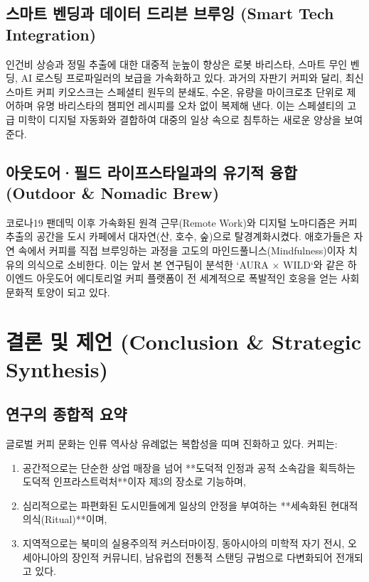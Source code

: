 \documentclass[10pt,a4paper]{article}
\begin{document}
\subsection{스마트 벤딩과 데이터 드리븐 브루잉 (Smart Tech Integration)}
인건비 상승과 정밀 추출에 대한 대중적 눈높이 향상은 로봇 바리스타, 스마트 무인 벤딩, AI 로스팅 프로파일러의 보급을 가속화하고 있다.
과거의 자판기 커피와 달리, 최신 스마트 커피 키오스크는 스페셜티 원두의 분쇄도, 수온, 유량을 마이크로초 단위로 제어하며 유명 바리스타의 챔피언 레시피를 오차 없이 복제해 낸다. 이는 스페셜티의 고급 미학이 디지털 자동화와 결합하여 대중의 일상 속으로 침투하는 새로운 양상을 보여준다.

\subsection{아웃도어·필드 라이프스타일과의 유기적 융합 (Outdoor \& Nomadic Brew)}
코로나19 팬데믹 이후 가속화된 원격 근무(Remote Work)와 디지털 노마디즘은 커피 추출의 공간을 도시 카페에서 대자연(산, 호수, 숲)으로 탈경계화시켰다.
애호가들은 자연 속에서 커피를 직접 브루잉하는 과정을 고도의 마인드풀니스(Mindfulness)이자 치유의 의식으로 소비한다. 이는 앞서 본 연구팀이 분석한 `AURA × WILD`와 같은 하이엔드 아웃도어 에디토리얼 커피 플랫폼이 전 세계적으로 폭발적인 호응을 얻는 사회문화적 토양이 되고 있다.

\section{결론 및 제언 (Conclusion \& Strategic Synthesis)}

\subsection{연구의 종합적 요약}
글로벌 커피 문화는 인류 역사상 유례없는 복합성을 띠며 진화하고 있다. 커피는:
\begin{enumerate}[itemsep=2pt]
    \item 공간적으로는 단순한 상업 매장을 넘어 **도덕적 인정과 공적 소속감을 획득하는 도덕적 인프라스트럭처**이자 제3의 장소로 기능하며,
    \item 심리적으로는 파편화된 도시민들에게 일상의 안정을 부여하는 **세속화된 현대적 의식(Ritual)**이며,
    \item 지역적으로는 북미의 실용주의적 커스터마이징, 동아시아의 미학적 자기 전시, 오세아니아의 장인적 커뮤니티, 남유럽의 전통적 스탠딩 규범으로 다변화되어 전개되고 있다.
\end{enumerate}
\end{document}
